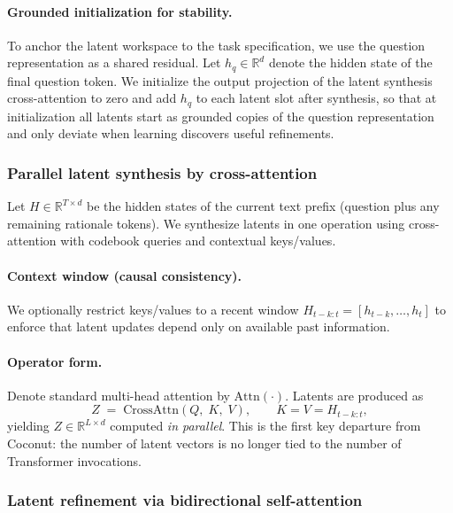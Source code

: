 \paragraph{Grounded initialization for stability.}
To anchor the latent workspace to the task specification, we use the question representation as a
shared residual. Let $h_q\in\mathbb{R}^d$ denote the hidden state of the final question token.
We initialize the output projection of the latent synthesis cross-attention to zero and add $h_q$ to
each latent slot after synthesis, so that at initialization all latents start as grounded copies of the
question representation and only deviate when learning discovers useful refinements. 


\subsubsection{Parallel latent synthesis by cross-attention}
\label{sec:latent_synthesis}

Let $H\in\mathbb{R}^{T\times d}$ be the hidden states of the current text prefix (question plus any
remaining rationale tokens). We synthesize latents in one operation using cross-attention with
codebook queries and contextual keys/values.

\paragraph{Context window (causal consistency).}
We optionally restrict keys/values to a recent window $H_{t-k:t}=[h_{t-k},\dots,h_t]$ to enforce that
latent updates depend only on available past information. 

\paragraph{Operator form.}
Denote standard multi-head attention by $\mathrm{Attn}(\cdot)$. Latents are produced as
\[
Z \;=\; \mathrm{CrossAttn}(Q,\;K,\;V), \qquad
K=V=H_{t-k:t},
\]
yielding $Z\in\mathbb{R}^{L\times d}$ computed \emph{in parallel}. This is the first key departure from
Coconut: the number of latent vectors is no longer tied to the number of Transformer invocations.



\subsubsection{Latent refinement via bidirectional self-attention}
\label{sec:latent_deliberation}

